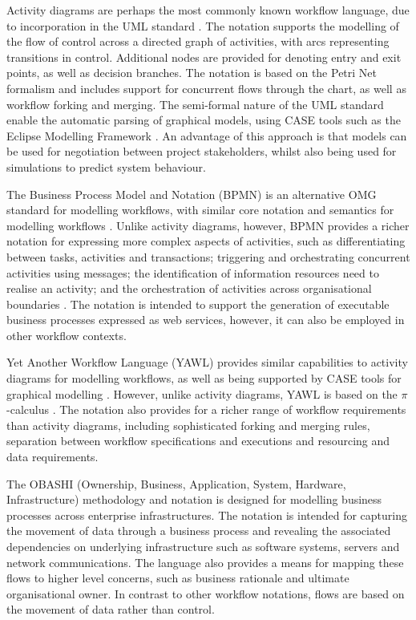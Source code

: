 \documentclass{sig-alternate}
\newcommand{\picalc}{\(\pi\)-calculus }
\begin{document}
Activity diagrams are perhaps the most commonly known workflow language, due to incorporation in the UML standard
\citep{omg2010omguml}.  The notation supports the modelling of the flow of control across a directed graph of
activities, with arcs representing transitions in control.  Additional nodes are provided for denoting entry and exit
points, as well as decision branches.  The notation is based on the Petri Net formalism and includes support for
concurrent flows through the chart, as well as workflow forking and merging. The semi-formal nature of the UML standard
enable the automatic parsing of graphical models, using CASE tools such as the Eclipse Modelling Framework
\citep{EMFManual}.  An advantage of this approach is that models can be used for negotiation between project
stakeholders, whilst also being used for simulations to predict system behaviour.

The Business Process Model and Notation (BPMN) is an alternative OMG standard for modelling workflows, with similar core
notation and semantics for modelling workflows \citep{omg2011omgbpmn}.  Unlike activity diagrams, however, BPMN provides
a richer notation for expressing more complex aspects of activities, such as differentiating between tasks, activities
and transactions; triggering and orchestrating concurrent activities using messages; the identification of information
resources need to realise an activity; and the orchestration of activities across organisational boundaries
\citep{White2004}.  The notation is intended to support the generation of executable business processes expressed as web
services, however, it can also be employed in other workflow contexts.

Yet Another Workflow Language (YAWL) provides similar capabilities to activity diagrams for modelling workflows, as well
as being supported by CASE tools for graphical modelling \citep{hofstede2010yawl}.  However, unlike activity diagrams,
YAWL is based on the \picalc\citep{Aalst2004}.  The notation also provides for a richer range of workflow requirements
than activity diagrams, including sophisticated forking and merging rules, separation between workflow specifications
and executions and resourcing and data requirements.

The OBASHI (Ownership, Business, Application, System, Hardware, Infrastructure) methodology and notation
\citep{obashimethodology} is designed for modelling business processes across enterprise infrastructures.  The notation
is intended for capturing the movement of data through a business process and revealing the associated dependencies on
underlying infrastructure such as software systems, servers and network communications.  The language also provides a
means for mapping these flows to higher level concerns, such as business rationale and ultimate organisational owner. In
contrast to other workflow notations, flows are based on the movement of data rather than control.
\end{document}
